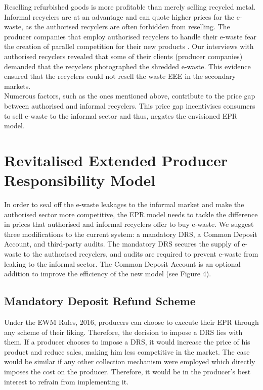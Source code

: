 \documentclass[a4paper, 12pt]{article}
\begin{document}
                    Reselling refurbished goods is more profitable than merely selling recycled metal. Informal recyclers are at an advantage and can quote higher prices for the e-waste, as the authorised recyclers are often forbidden from reselling. The producer companies that employ authorised recyclers to handle their e-waste fear the creation of parallel competition for their new products \parencite{alevphd}. Our interviews with authorised recyclers revealed that some of their clients (producer companies) demanded that the recyclers photographed the shredded e-waste. This evidence ensured that the recyclers could not resell the waste EEE in the secondary markets.\\
                    
                    Numerous factors, such as the ones mentioned above, contribute to the price gap between authorised and informal recyclers. This price gap incentivises consumers to sell e-waste to the informal sector and thus, negates the envisioned EPR model.
                    
                    
                    \section{Revitalised Extended Producer Responsibility Model}\label{sec:4}
                    
                    In order to seal off the e-waste leakages to the informal market and make the authorised sector more competitive, the EPR model needs to tackle the difference in prices that authorised and informal recyclers offer to buy e-waste. We suggest three modifications to the current system: a mandatory DRS, a Common Deposit Account, and third-party audits. The mandatory DRS secures the supply of e-waste to the authorised recyclers, and audits are required to prevent e-waste from leaking to the informal sector. The Common Deposit Account is an optional addition to improve the efficiency of the new model (see Figure 4). 
                    
                    \subsection{Mandatory Deposit Refund Scheme}
                    
                    Under the EWM Rules, 2016, producers can choose to execute their EPR through any scheme of their liking. Therefore, the decision to impose a DRS lies with them. If a producer chooses to impose a DRS, it would increase the price of his product and reduce sales, making him less competitive in the market. The case would be similar if any other collection mechanism were employed which directly imposes the cost on the producer. Therefore, it would be in the producer’s best interest to refrain from implementing it. \\
                    
\end{document}
